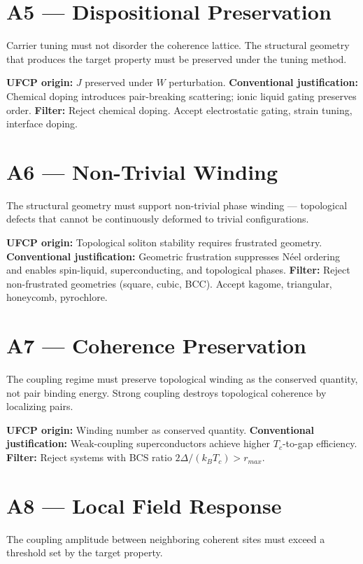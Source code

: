 \documentclass[11pt, a4paper]{article}
\begin{document}
\section{A5 --- Dispositional Preservation}

Carrier tuning must not disorder the coherence lattice. The
structural geometry that produces the target property must be
preserved under the tuning method.

\textbf{UFCP origin:} $J$ preserved under $W$ perturbation.
\textbf{Conventional justification:} Chemical doping introduces
pair-breaking scattering; ionic liquid gating preserves order.
\textbf{Filter:} Reject chemical doping. Accept electrostatic gating,
strain tuning, interface doping.

\section{A6 --- Non-Trivial Winding}

The structural geometry must support non-trivial phase winding ---
topological defects that cannot be continuously deformed to trivial
configurations.

\textbf{UFCP origin:} Topological soliton stability requires
frustrated geometry.
\textbf{Conventional justification:} Geometric frustration suppresses
N\'eel ordering and enables spin-liquid, superconducting, and
topological phases.
\textbf{Filter:} Reject non-frustrated geometries (square, cubic, BCC).
Accept kagome, triangular, honeycomb, pyrochlore.

\section{A7 --- Coherence Preservation}

The coupling regime must preserve topological winding as the
conserved quantity, not pair binding energy. Strong coupling
destroys topological coherence by localizing pairs.

\textbf{UFCP origin:} Winding number as conserved quantity.
\textbf{Conventional justification:} Weak-coupling superconductors
achieve higher $T_c$-to-gap efficiency.
\textbf{Filter:} Reject systems with BCS ratio
$2\Delta/(k_BT_c) > r_{max}$.

\section{A8 --- Local Field Response}

The coupling amplitude between neighboring coherent sites must
exceed a threshold set by the target property.
\end{document}
